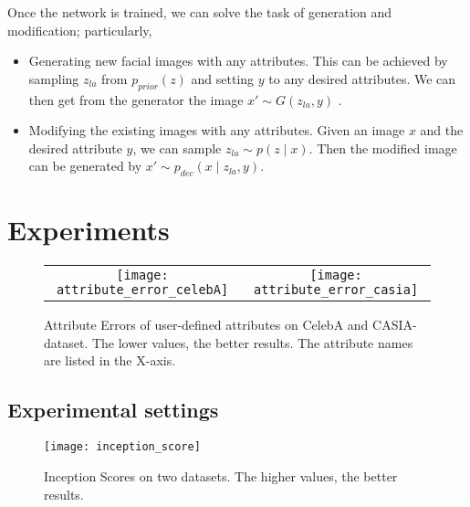 \documentclass[10pt,letterpaper,twocolumn]{article}
\providecommand{\tabularnewline}{\\}
\begin{document}
Once the network is trained, we can solve the task of generation and
modification; particularly, 
\begin{itemize}
\item Generating new facial images with any attributes. This can be achieved
by sampling $z_{la}$ from $p_{prior}\left(z\right)$ and setting
$y$ to any desired attributes. We can then get from the generator
the image $x'\sim G\left(z_{la},y\right)$ . 
\item Modifying the existing images with any attributes. Given an image
$x$ and the desired attribute $y$, we can sample $z_{la}\sim p\left(z\mid x\right)$.
Then the modified image can be generated by $x'\sim p_{dec}\left(x\mid z_{la},y\right)$. 
\end{itemize}

\section{Experiments}

\begin{figure*}
\centering{}%
\begin{tabular}{cc}
\texttt{[image: attribute\_error\_celebA]}  & \texttt{[image: attribute\_error\_casia]}\tabularnewline
\end{tabular}\caption{\label{fig:Attribute-CelebA}Attribute Errors of user-defined attributes
on CelebA and CASIA- dataset. The lower values, the better results.
The attribute names are listed in the X-axis.}
\end{figure*}


\subsection{Experimental settings}

\begin{figure}
\centering{}\texttt{[image: inception\_score]}\caption{\label{fig:Inception-Scores-on}Inception Scores on two datasets.
The higher values, the better results.}
\end{figure}
\end{document}
